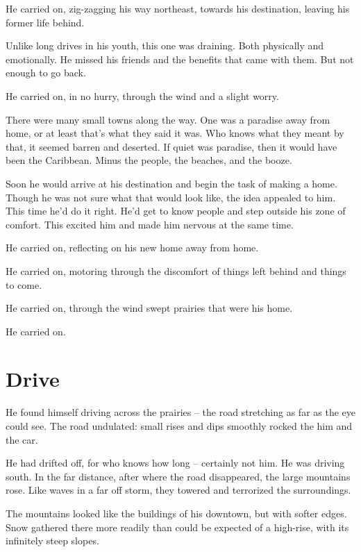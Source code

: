 \documentclass[fontsize=12pt,english]{scrreprt}
\begin{document}
He carried on, zig-zagging his way northeast, towards his destination,
leaving his former life behind.


Unlike long drives in his youth, this one was draining. Both
physically and emotionally. He missed his friends and the benefits
that came with them. But not enough to go back.

He carried on, in no hurry, through the wind and a slight worry.

There were many small towns along the way. One was a paradise away
from home, or at least that's what they said it was. Who knows what
they meant by that, it seemed barren and deserted. If quiet was
paradise, then it would have been the Caribbean. Minus the people, the
beaches, and the booze.

Soon he would arrive at his destination and begin the task of making a
home. Though he was not sure what that would look like, the idea
appealed to him. This time he'd do it right. He'd get to know people
and step outside his zone of comfort. This excited him and made him
nervous at the same time.

He carried on, reflecting on his new home away from home.

He carried on, motoring through the discomfort of things left behind
and things to come.

He carried on, through the wind swept prairies that were his home.

He carried on.

\newpage

\section{Drive}

He found himself driving across the prairies -- the road stretching as
far as the eye could see. The road undulated: small rises and dips
smoothly rocked the him and the car.

He had drifted off, for who knows how long -- certainly not him. He
was driving south. In the far distance, after where the road
disappeared, the large mountains rose. Like waves in a far off storm,
they towered and terrorized the surroundings.

The mountains looked like the buildings of his downtown, but with
softer edges. Snow gathered there more readily than could be expected
of a high-rise, with its infinitely steep slopes.
\end{document}
